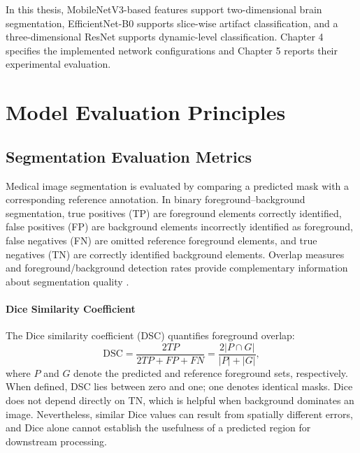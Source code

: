 In this thesis, MobileNetV3-based features support two-dimensional brain segmentation, EfficientNet-B0 supports slice-wise artifact classification, and a three-dimensional ResNet supports dynamic-level classification. Chapter 4 specifies the implemented network configurations and Chapter 5 reports their experimental evaluation.

\section{Model Evaluation Principles}

\subsection{Segmentation Evaluation Metrics}

Medical image segmentation is evaluated by comparing a predicted mask with a corresponding reference annotation. In binary foreground--background segmentation, true positives (TP) are foreground elements correctly identified, false positives (FP) are background elements incorrectly identified as foreground, false negatives (FN) are omitted reference foreground elements, and true negatives (TN) are correctly identified background elements. Overlap measures and foreground/background detection rates provide complementary information about segmentation quality \autocite{isensee2021nnunet,payette2023feta}.

\paragraph{Dice Similarity Coefficient}
The Dice similarity coefficient (DSC) quantifies foreground overlap:
\begin{equation}
\mathrm{DSC}=\frac{2TP}{2TP+FP+FN}
=\frac{2|P\cap G|}{|P|+|G|},
\end{equation}
where $P$ and $G$ denote the predicted and reference foreground sets, respectively. When defined, DSC lies between zero and one; one denotes identical masks. Dice does not depend directly on TN, which is helpful when background dominates an image. Nevertheless, similar Dice values can result from spatially different errors, and Dice alone cannot establish the usefulness of a predicted region for downstream processing.

